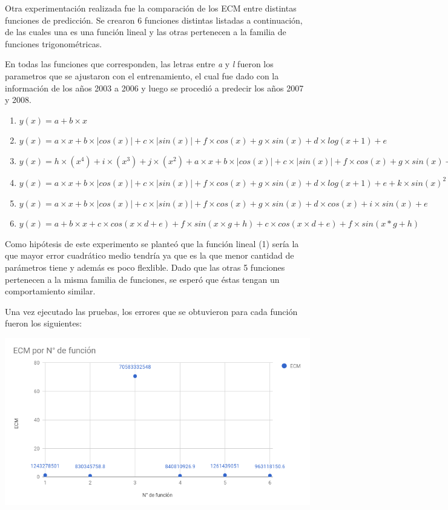 Otra experimentación realizada fue la comparación de los ECM entre distintas funciones de predicción. Se crearon 6 funciones distintas listadas a continuación, de las cuales una es una función lineal y las otras pertenecen a la familia de funciones trigonométricas.

En todas las funciones que corresponden, las letras entre \textit{a} y \textit{l} fueron los parametros que se ajustaron con el entrenamiento, el cual fue dado con la información de los años 2003 a 2006 y luego se procedió a predecir los años 2007 y 2008.

\begin{enumerate}
  \item $y(x) = a + b \times x$
  \item $y(x) = a \times x + b  \times  |cos(x)| + c  \times  |sin(x)| + f  \times  cos(x) + g  \times  sin(x) + d  \times  log(x+1) + e$
  \item $y(x) = h \times (x^4) + i \times (x^3) + j \times (x^2) + a \times x + b  \times  |cos(x)| + c  \times  |sin(x)| + f  \times  cos(x) + g  \times  sin(x) + d  \times  log(x+1) + e$
  \item $y(x) = a \times x + b  \times  |cos(x)| + c  \times  |sin(x)| + f  \times  cos(x) + g  \times  sin(x) + d  \times  log(x+1) + e + k  \times  sin(x) ^ 2 + l  \times  cos(x) ^ 2$
  \item $y(x) = a \times x + b  \times  |cos(x)| + c  \times  |sin(x)| + f  \times  cos(x) + g  \times  sin(x) + d  \times  cos(x) + i  \times  sin(x)  + e$
  \item $y(x) = a + b  \times  x + c  \times  cos(x \times d+e) + f  \times  sin(x \times g+h) + c  \times  cos(x \times d+e) + f  \times  sin(x*g+h)$
\end{enumerate}


Como hipótesis de este experimento se planteó que la función lineal (1) sería la que mayor error cuadrático medio tendría ya que es la que menor cantidad de parámetros tiene y además es poco flexlible. Dado que las otras 5 funciones pertenecen a la misma familia de funciones, se esperó que éstas tengan un comportamiento similar.

Una vez ejecutado las pruebas, los errores que se obtuvieron para cada función fueron los siguientes:

\includegraphics[scale=0.7,natwidth=403,natheight=735]{imagenes/ecm_por_fn.png}

